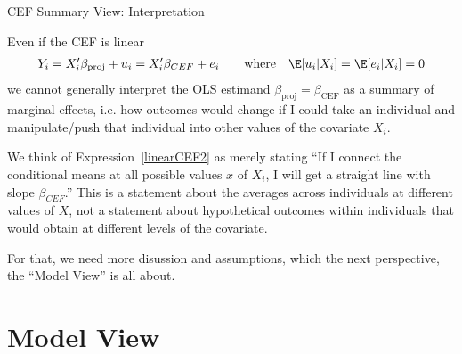 \documentclass[aspectratio=169, handout]{beamer}
\begin{document}
{\footnotesize
\begin{frame}{CEF Summary View: Interpretation}

Even if the CEF is linear
\begin{align}
  Y_i
  =
  X_i'\beta_{\text{proj}}
  +
  u_i
  =
  X_i'\beta_{CEF}
  +
  e_i
  \qquad\text{where}\quad
  \E[u_i|X_i]=
  \E[e_i|X_i]=0
  \label{linearCEF2}
\end{align}
we \alert{cannot} generally interpret the OLS estimand
$\beta_{\text{proj}}=\beta_{\text{CEF}}$ as a summary of
\alert{marginal effects},
i.e. how outcomes \alert{would} change if I could take an individual and
\alert{manipulate}/\alert{push} that individual into other values of the
covariate $X_i$.

We think of Expression~\ref{linearCEF2} as merely stating ``If I connect
the conditional means at all possible values $x$ of $X_i$, I will get a
straight line with slope $\beta_{CEF}$.''
This is a statement about the \alert{averages across individuals} at
different values of $X$, not a statement about
\alert{hypothetical outcomes within individuals} that would obtain at
different levels of the covariate.

For that, we need more disussion and assumptions, which the next
perspective, the ``Model View'' is all about.
\end{frame}
}



\section{Model View}

\end{document}
